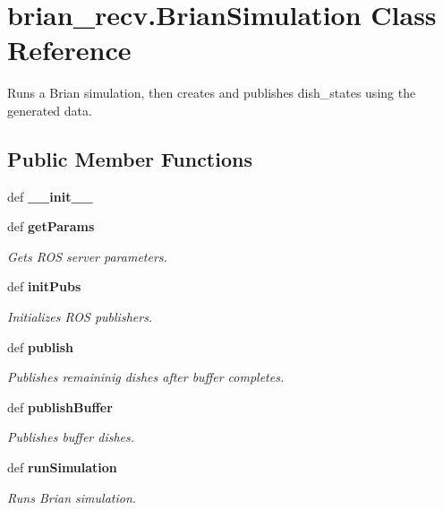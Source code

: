 \section{brian\-\_\-recv.\-Brian\-Simulation \-Class \-Reference}
\label{classbrian__recv_1_1BrianSimulation}


\-Runs a \-Brian simulation, then creates and publishes dish\-\_\-states using the generated data.  


\subsection*{\-Public \-Member \-Functions}
\begin{DoxyCompactItemize}
\item 
def {\bf \-\_\-\-\_\-init\-\_\-\-\_\-}
\item 
def {\bf get\-Params}
\begin{DoxyCompactList}\small\item\em \-Gets \-R\-O\-S server parameters. \end{DoxyCompactList}\item 
def {\bf init\-Pubs}
\begin{DoxyCompactList}\small\item\em \-Initializes \-R\-O\-S publishers. \end{DoxyCompactList}\item 
def {\bf publish}
\begin{DoxyCompactList}\small\item\em \-Publishes remaininig dishes after buffer completes. \end{DoxyCompactList}\item 
def {\bf publish\-Buffer}
\begin{DoxyCompactList}\small\item\em \-Publishes buffer dishes. \end{DoxyCompactList}\item 
def {\bf run\-Simulation}
\begin{DoxyCompactList}\small\item\em \-Runs \-Brian simulation. \end{DoxyCompactList}\end{DoxyCompactItemize}
